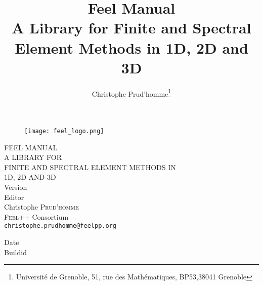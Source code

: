 \documentclass[a4paper]{book}
\title{Feel Manual\\
A Library for Finite and Spectral Element Methods in 1D, 2D and 3D\\
{\small \feelversion }}
\author{Christophe Prud'homme\thanks{Université de Grenoble,
51, rue des Mathématiques, BP53,38041 Grenoble}}
\date{}
\newcommand{\feel}{\textsc{Feel++}\xspace}
\begin{document}
\thispagestyle{empty}





\begin{figure}[!h]
\centering
\texttt{[image: feel\_logo.png]}
\end{figure}


\begin{center}
  {\Large
    FEEL MANUAL \\
    A LIBRARY FOR \\
    FINITE AND SPECTRAL ELEMENT METHODS IN \\
    1D, 2D AND 3D\\
    \bigskip
    {\small Version \feelversion }}\\[0.6cm]
    Editor\\
  Christophe \textsc{Prud'homme}\\
  \feel Consortium\\
  \texttt{christophe.prudhomme@feelpp.org}\\
  \par\vspace{2cm}

  \begin{flushright}
    \footnotesize
    Date \feeldate\\
    Buildid \feelbuildid
  \end{flushright}
  \par\vspace{5cm}



\end{center}
\end{document}
